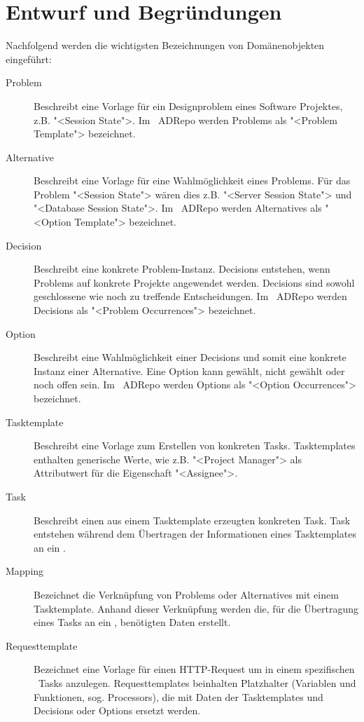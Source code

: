 	\section{Entwurf und Begründungen}
		Nachfolgend werden die wichtigsten Bezeichnungen von Domänenobjekten eingeführt:
		
		\begin{description}
			\item[Problem] Beschreibt eine Vorlage für ein Designproblem eines Software Projektes, 
				z.B. "<Session State">. 
				Im \dks\ ADRepo werden Problems als "<Problem Template"> bezeichnet.
			\item[Alternative] Beschreibt eine Vorlage für eine Wahlmöglichkeit eines Problems.
				Für das Problem "<Session State"> wären dies z.B. "<Server Session State"> und
				"<Database Session State">. 
				Im \dks\ ADRepo werden Alternatives als "<Option Template"> bezeichnet.
			\item[Decision] Beschreibt eine konkrete Problem-Instanz.
				Decisions entstehen, wenn Problems auf konkrete Projekte angewendet werden.
				Decisions sind sowohl geschlossene wie noch zu treffende Entscheidungen.
				Im \dks\ ADRepo werden Decisions als "<Problem Occurrences"> bezeichnet.
			\item[Option] Beschreibt eine Wahlmöglichkeit einer Decisions 
				und somit eine konkrete Instanz einer Alternative.
				Eine Option kann gewählt, nicht gewählt oder noch offen sein.
				Im \dks\ ADRepo werden Options als "<Option Occurrences"> bezeichnet.
			\item[Tasktemplate] Beschreibt eine Vorlage zum Erstellen von konkreten Tasks.
				Tasktemplates enthalten generische Werte, wie z.B. "<Project Manager"> als
				Attributwert für die Eigenschaft "<Assignee">.
			\item[Task] Beschreibt einen aus einem Tasktemplate erzeugten konkreten Task.
				Task entstehen während dem Übertragen der Informationen eines Tasktemplates an ein \ppt.
			\item[Mapping] Bezeichnet die Verknüpfung von Problems oder Alternatives mit einem Tasktemplate. 
				Anhand dieser Verknüpfung werden die, für die Übertragung eines Tasks an ein \ppt, benötigten Daten erstellt.
			\item[Requesttemplate] Bezeichnet eine Vorlage für einen HTTP-Request um 
				in einem spezifischen \ppt\ Tasks anzulegen.
				Requesttemplates beinhalten Platzhalter (Variablen und Funktionen, sog. Processors),
				die mit Daten der Tasktemplates und Decisions oder Options ersetzt werden. 
		\end{description}	
	

